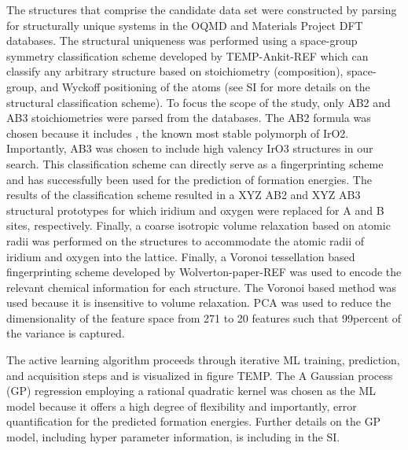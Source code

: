 
The structures that comprise the candidate data set were constructed by parsing for structurally unique systems in the OQMD and Materials Project DFT databases.
The structural uniqueness was performed using a space-group symmetry classification scheme developed by TEMP-Ankit-REF which can classify any arbitrary structure based on stoichiometry (composition), space-group, and Wyckoff positioning of the atoms
 (see SI for more details on the structural classification scheme).
To focus the scope of the study, only AB2 and AB3 stoichiometries were parsed from the databases.
The AB2 formula was chosen because it includes \rIrOtwo, the known most stable polymorph of IrO2.
Importantly, AB3 was chosen to include high valency IrO3 structures in our search.
This classification scheme can directly serve as a fingerprinting scheme and has successfully been used for the prediction of formation energies.  %
The results of the classification scheme resulted in a XYZ AB2 and XYZ AB3 structural prototypes for which iridium and oxygen were replaced for A and B sites, respectively.
Finally, a coarse isotropic volume relaxation based on atomic radii was performed on the structures to accommodate the atomic radii of iridium and oxygen into the lattice.
Finally, a Voronoi tessellation based fingerprinting scheme developed by Wolverton-paper-REF was used to encode the relevant chemical information for each structure.
The Voronoi based method was used because it is insensitive to volume relaxation.
PCA was used to reduce the dimensionality of the feature space from 271  to 20 features such that 99percent of the variance is captured.


The active learning algorithm proceeds through iterative ML training, prediction, and acquisition steps and is visualized in figure TEMP.
The
A Gaussian process (GP) regression employing a rational quadratic kernel was chosen as the ML model because it offers a high degree of flexibility and importantly, error quantification for the predicted formation energies.
Further details on the GP model, including hyper parameter information, is including in the SI.


